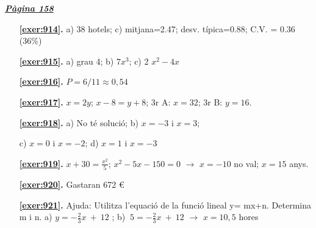 
\hyperlink{page.158}{\textbf{\em Pàgina 158}}
\begin{enumerate}
\item[\fontfamily{phv}\selectfont\color{blue}\textbf{\ref{exer:914}. }] \label{ans:914} 
 a) 38 hotels; c) mitjana=2.47; desv. típica=0.88; C.V. = 0.36 (36\%)
 \end{enumerate}
\begin{enumerate}
\item[\fontfamily{phv}\selectfont\color{blue}\textbf{\ref{exer:915}. }] \label{ans:915} 
 a) grau 4; \quad b) $7x^{3}$; \quad c) 2 $x^{2}-4x$
\item[\fontfamily{phv}\selectfont\color{blue}\textbf{\ref{exer:916}. }] \label{ans:916} 
 $P=6/11 \approx 0,54$
\item[\fontfamily{phv}\selectfont\color{blue}\textbf{\ref{exer:917}. }] \label{ans:917} 
 $x=2y$; $x -8 = y+8$; \quad 3r A: $x= 32$; \quad 3r B: $y=16$.
\item[\fontfamily{phv}\selectfont\color{blue}\textbf{\ref{exer:918}. }] \label{ans:918} 
 a) No té solució; \quad b) $x=-3$ i $x=3$; \par c) $x=0$ i $x=-2$; \quad d) $x=1$ i $x=-3$
\item[\fontfamily{phv}\selectfont\color{blue}\textbf{\ref{exer:919}. }] \label{ans:919} 
 $x+30=\frac {x^2}{5}$; $x^2-5x-150=0$ $\rightarrow $ $x=-10$ no val; $x=15$ anys.
\item[\fontfamily{phv}\selectfont\color{blue}\textbf{\ref{exer:920}. }] \label{ans:920} 
 Gastaran 672 \euro {} 
\item[\fontfamily{phv}\selectfont\color{blue}\textbf{\ref{exer:921}. }] \label{ans:921} 
Ajuda: Utilitza l'equació de la funció lineal y= mx+n. Determina m i n. a) $y=-\frac {2}{3}x\ +\ 12$ ; \quad b) $\ 5=-\frac {2}{3}x\ +\ 12$ $\rightarrow $ $x=10,5$ hores
 \end{enumerate}
\vspace{0.3cm}


